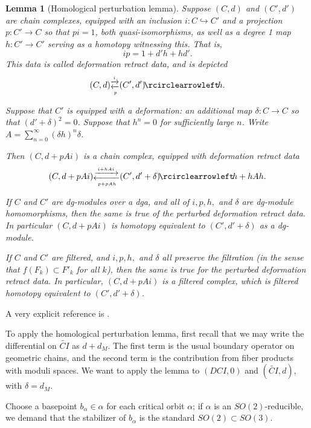 \documentclass{memo-l}
\newtheorem{lemma}[theorem]{Lemma}
\theoremstyle{definition}
\theoremstyle{remark}
\numberwithin{section}{chapter}
\numberwithin{equation}{chapter}
\begin{document}
\begin{lemma}[Homological perturbation lemma]\label{HPL}Suppose $(C,d)$ and $(C',d')$ are chain complexes, equipped with an inclusion $i: C \hookrightarrow C'$ and a projection $p: C' \to C$ so that $pi = 1$, both quasi-isomorphisms, as well as a degree 1 map $h: C' \to C'$ serving as a homotopy witnessing this. That is, $$ip = 1 + d'h + h d'.$$ This data is called deformation retract data, and is depicted $$(C,d) \substack{\xrightarrow{i}\\ \xleftarrow[p]{}} (C',d') \! \rcirclearrowleft \! h.$$

Suppose that $C'$ is equipped with a \emph{deformation}: an additional map $\delta: C \to C$ so that $(d' + \delta)^2 = 0$. Suppose that $h^n = 0$ for sufficiently large $n$. Write $A = \sum_{n=0}^\infty (\delta h)^n\delta$. 

Then $(C, d + pAi)$ is a chain complex, equipped with deformation retract data $$(C,d+pAi) \substack{\xrightarrow{i+hAi}\\ \xleftarrow[p+pAh]{}} (C',d'+\delta) \! \rcirclearrowleft \! h+hAh.$$

If $C$ and $C'$ are dg-modules over a dga, and all of $i, p,h, $ and $\delta$ are dg-module homomorphisms, then the same is true of the perturbed deformation retract data. In particular $(C,d+pAi)$ is homotopy equivalent to $(C',d'+\delta)$ as a dg-module. 

If $C$ and $C'$ are filtered, and $i, p, h,$ and $\delta$ all preserve the filtration (in the sense that $f(F_k) \subset F'_k$ for all $k$), then the same is true for the perturbed deformation retract data. In particular, $(C,d+pAi)$ is a filtered complex, which is filtered homotopy equivalent to $(C',d'+\delta)$.  
\end{lemma}

A very explicit reference is \cite{crainic2004perturbation}. 

To apply the homological perturbation lemma, first recall that we may write the differential on $\widetilde{CI}$ as $d + d_M$. The first term is the usual boundary operator on geometric chains, and the second term is the contribution from fiber products with moduli spaces. We want to apply the lemma to $(DCI, 0)$ and $(\widetilde{CI}, d)$, with $\delta = d_M$. 

Choose a basepoint $b_\alpha \in \alpha$ for each critical orbit $\alpha$; if $\alpha$ is an $SO(2)$-reducible, we demand that the stabilizer of $b_\alpha$ is the standard $SO(2) \subset SO(3)$. 
\end{document}
